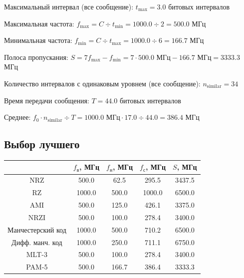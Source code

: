 Максимальный интервал (все сообщение): $t_\mathrm{max}=3.0$ битовых интервалов

Максимальная частота: $f_\mathrm{max}=C\div t_\mathrm{min}=1000.0\div 2=500.0$ МГц

Минимальная частота: $f_\mathrm{min}=C\div t_\mathrm{max}=1000.0\div 6=166.7$ МГц

Полоса пропускания: $S=7f_\mathrm{max}-f_\mathrm{min} = 7\cdot 500.0\text{ МГц}-166.7\text{ МГц}=3333.3$ МГц

Количество интервалов с одинаковым уровнем (все сообщение): $n_\mathrm{similar}=34$

Время передачи сообщения: $T=44.0$ битовых интервалов

Среднее: $f_0\cdot n_\mathrm{similar}\div T=1000.0\text{ МГц}\cdot 17.0\div 44.0=386.4$ МГц

\subsection{Выбор лучшего}
\begin{center}
    \begin{tabular}{c|cccc}
        & $f_\mathrm{\text{в}}$, МГц
        & $f_\mathrm{\text{н}}$, МГц
        & $f_\mathrm{\text{с}}$, МГц
        & $S$, МГц \\ \hline
        NRZ               &  500.0 &  62.5 &  295.5 & 3437.5 \\
        RZ                & 1000.0 & 500.0 & 1000.0 & 6500.0 \\
        AMI               &  500.0 & 125.0 &  426.1 & 3375.0 \\
        NRZI              &  500.0 & 100.0 &  278.4 & 3400.0 \\
        Манчестерский код & 1000.0 & 500.0 &  710.2 & 6500.0 \\
        Дифф. манч. код   & 1000.0 & 250.0 &  711.1 & 6750.0 \\
        MLT-3             &  500.0 & 100.0 &  278.4 & 3400.0 \\
        PAM-5             &  500.0 & 166.7 &  386.4 & 3333.3 \\
    \end{tabular}
\end{center}

